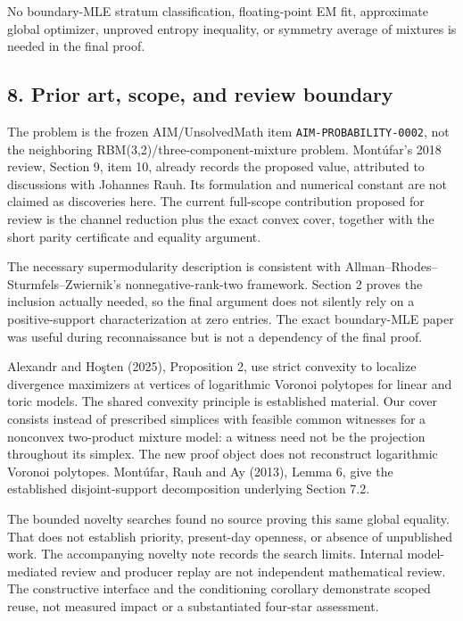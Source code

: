 No boundary-MLE stratum classification, floating-point EM fit,
approximate global optimizer, unproved entropy inequality, or symmetry
average of mixtures is needed in the final proof.

\subsection{8. Prior art, scope, and review
boundary}\label{prior-art-scope-and-review-boundary}

The problem is the frozen AIM/UnsolvedMath item
\texttt{AIM-PROBABILITY-0002}, not the neighboring
RBM(3,2)/three-component-mixture problem. Montúfar's 2018 review,
Section 9, item 10, already records the proposed value, attributed to
discussions with Johannes Rauh. Its formulation and numerical constant
are not claimed as discoveries here. The current full-scope contribution
proposed for review is the channel reduction plus the exact convex
cover, together with the short parity certificate and equality argument.

The necessary supermodularity description is consistent with
Allman--Rhodes--Sturmfels--Zwiernik's nonnegative-rank-two framework.
Section 2 proves the inclusion actually needed, so the final argument
does not silently rely on a positive-support characterization at zero
entries. The exact boundary-MLE paper was useful during reconnaissance
but is not a dependency of the final proof.

Alexandr and Hoşten (2025), Proposition 2, use strict convexity to
localize divergence maximizers at vertices of logarithmic Voronoi
polytopes for linear and toric models. The shared convexity principle is
established material. Our cover consists instead of prescribed simplices
with feasible common witnesses for a nonconvex two-product mixture
model: a witness need not be the projection throughout its simplex. The
new proof object does not reconstruct logarithmic Voronoi polytopes.
Montúfar, Rauh and Ay (2013), Lemma 6, give the established
disjoint-support decomposition underlying Section 7.2.

The bounded novelty searches found no source proving this same global
equality. That does not establish priority, present-day openness, or
absence of unpublished work. The accompanying novelty note records the
search limits. Internal model-mediated review and producer replay are
not independent mathematical review. The constructive interface and the
conditioning corollary demonstrate scoped reuse, not measured impact or
a substantiated four-star assessment.

